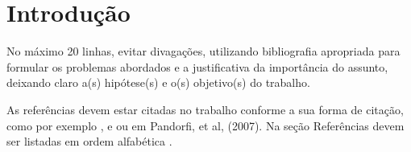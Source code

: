 \section*{Introdução}

No máximo 20 linhas, evitar divagações, utilizando bibliografia apropriada para formular os problemas abordados e a justificativa da importância do assunto, deixando claro a(s) hipótese(s) e o(s) objetivo(s) do trabalho. 

As referências devem estar citadas no trabalho conforme a sua forma de citação, como por exemplo \cite{alves}, \cite{galvani} e \cite{national_instruments} ou em Pandorfi, et al, (2007). Na seção Referências devem ser listadas em ordem alfabética \cite{pandorfi}.
